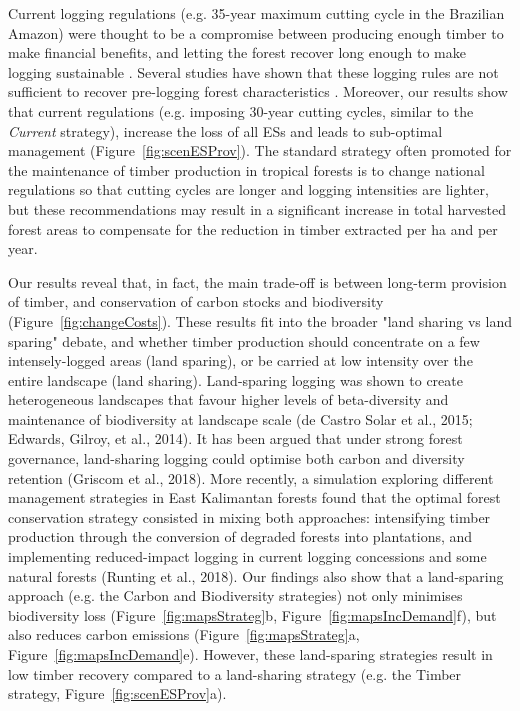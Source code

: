 \documentclass{article}
\begin{document}
Current logging regulations (e.g. 35-year maximum cutting cycle in the Brazilian Amazon) were thought to be a compromise between producing enough timber to make financial benefits, and letting the forest recover long enough to make logging sustainable \cite{Seydack2012}. Several studies have shown that these logging rules are not sufficient to recover pre-logging forest characteristics \cite{Sist2007,Zimmerman2012,Piponiot2018}. Moreover, our results show that current regulations (e.g. imposing 30-year cutting cycles, similar to the \textit{Current} strategy), increase the loss of all ESs and leads to sub-optimal management (Figure~\ref{fig:scenESProv}). The standard strategy often promoted for the maintenance of timber production in tropical forests is to change national regulations so that cutting cycles are longer and logging intensities are lighter, but these recommendations may result in a significant increase in total harvested forest areas to compensate for the reduction in timber extracted per ha and per year.

Our results reveal that, in fact, the main trade-off is between long-term provision of timber, and conservation of carbon stocks and biodiversity (Figure~\ref{fig:changeCosts}). These results fit into the broader "land sharing vs land sparing" debate, and whether timber production should concentrate on a few intensely-logged areas (land sparing), or be carried at low intensity over the entire landscape (land sharing). Land-sparing logging was shown to create heterogeneous landscapes that favour higher levels of beta-diversity and maintenance of biodiversity at landscape scale (de Castro Solar et al., 2015; Edwards, Gilroy, et al., 2014). It has been argued that under strong forest governance, land-sharing logging could optimise both carbon and diversity retention (Griscom et al., 2018). More recently, a simulation exploring different management strategies in East Kalimantan forests found that the optimal forest conservation strategy consisted in mixing both approaches: intensifying timber production through the conversion of degraded forests into plantations, and implementing reduced-impact logging in current logging concessions and some natural forests (Runting et al., 2018). Our findings also show that a land-sparing approach (e.g. the Carbon and Biodiversity strategies) not only minimises biodiversity loss (Figure~\ref{fig:mapsStrateg}b, Figure~\ref{fig:mapsIncDemand}f), but also reduces carbon emissions (Figure~\ref{fig:mapsStrateg}a, Figure~\ref{fig:mapsIncDemand}e). However, these land-sparing strategies result in low timber recovery compared to a land-sharing strategy (e.g. the Timber strategy, Figure~\ref{fig:scenESProv}a).
\end{document}
